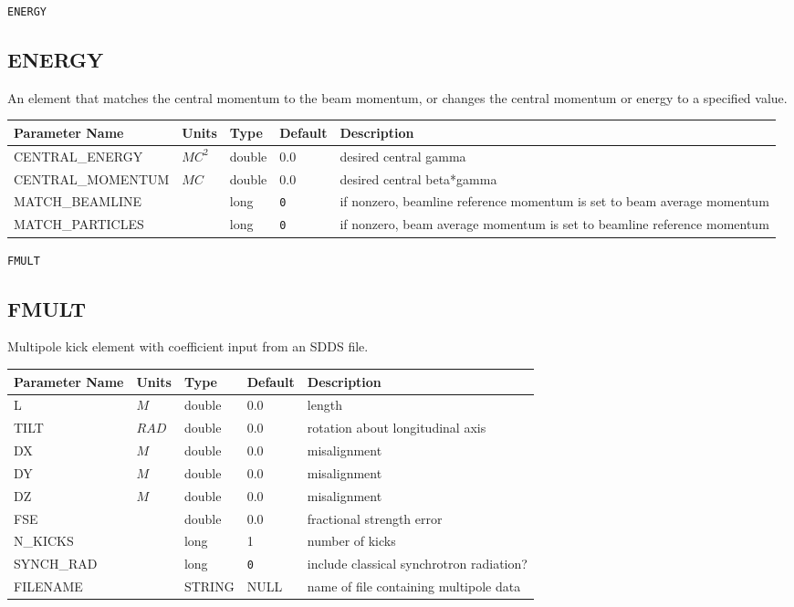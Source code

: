 \begin{latexonly}
\newpage
\begin{center}{\Large\verb|ENERGY|}\end{center}
\end{latexonly}\subsection{ENERGY}
An element that matches the central momentum to the beam momentum, or changes
the central momentum or energy to a specified value.
\\
\begin{tabular}{|l|l|l|l|p{\descwidth}|} \hline
Parameter Name & Units & Type & Default & Description \\ \hline 
CENTRAL\_ENERGY & $MC^{2}$ & double &  0.0 & desired central gamma  \\ \hline 
CENTRAL\_MOMENTUM & $MC$ & double &  0.0 & desired central beta*gamma  \\ \hline 
MATCH\_BEAMLINE &  & long &  \verb|0| & if nonzero, beamline reference momentum is set to beam average momentum  \\ \hline 
MATCH\_PARTICLES &  & long &  \verb|0| & if nonzero, beam average momentum is set to beamline reference momentum  \\ \hline 
\end{tabular}

\begin{latexonly}
\newpage
\begin{center}{\Large\verb|FMULT|}\end{center}
\end{latexonly}\subsection{FMULT}
Multipole kick element with coefficient input from an SDDS file.
\\
\begin{tabular}{|l|l|l|l|p{\descwidth}|} \hline
Parameter Name & Units & Type & Default & Description \\ \hline 
L & $M$ & double &  0.0 & length  \\ \hline 
TILT & $RAD$ & double &  0.0 & rotation about longitudinal axis  \\ \hline 
DX & $M$ & double &  0.0 & misalignment  \\ \hline 
DY & $M$ & double &  0.0 & misalignment  \\ \hline 
DZ & $M$ & double &  0.0 & misalignment  \\ \hline 
FSE &  & double &  0.0 & fractional strength error  \\ \hline 
N\_KICKS &  & long &   1               & number of kicks  \\ \hline 
SYNCH\_RAD &  & long &  \verb|0| & include classical synchrotron radiation?  \\ \hline 
FILENAME &  & STRING &   NULL            & name of file containing multipole data  \\ \hline 
\end{tabular}

